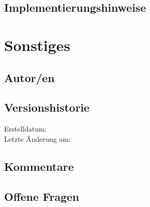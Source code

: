 \subsection*{Implementierungshinweise}
\prototype


\section*{Sonstiges}

\subsection*{Autor/en}
\authors

\subsection*{Versionshistorie}
Erstelldatum: \dateofcreation \\
Letzte Änderung am: \versionhistory

\subsection*{Kommentare}
\comments

\subsection*{Offene Fragen}
\questions

\listoffigures




